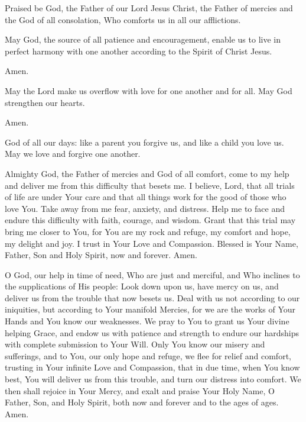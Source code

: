 \label{prayer:times_of_trouble}
Praised be God, the Father of our Lord Jesus Christ, the Father of mercies and the God of all consolation, Who comforts us in all our afflictions.

May God, the source of all patience and encouragement, enable us to live in perfect harmony with one another according to the Spirit of Christ Jesus.

\response Amen.

May the Lord make us overflow with love for one another and for all.
May God strengthen our hearts.

\response Amen.

God of all our days: like a parent you forgive us, and like a child you love us.
May we love and forgive one another.

Almighty God, the Father of mercies and God of all comfort, come to my help and deliver me from this difficulty that besets me.
I believe, Lord, that all trials of life are under Your care and that all things work for the good of those who love You.
Take away from me fear, anxiety, and distress.
Help me to face and endure this difficulty with faith, courage, and wisdom.
Grant that this trial may bring me closer to You, for You are my rock and refuge, my comfort and hope, my delight and joy.
I trust in Your Love and Compassion.
Blessed is Your Name, Father, Son and Holy Spirit, now and forever. Amen.

O God, our help in time of need, Who are just and merciful, and Who inclines to the supplications of His people:
Look down upon us, have mercy on us, and deliver us from the trouble that now besets us.
Deal with us not according to our iniquities, but according to Your manifold Mercies, for we are the works of Your Hands and You know our weaknesses.
We pray to You to grant us Your divine helping Grace, and endow us with patience and strength to endure our hardships with complete submission to Your Will.
Only You know our misery and sufferings, and to You, our only hope and refuge, we flee for relief and comfort, trusting in Your infinite Love and Compassion, that in due time, when You know best, You will deliver us from this trouble, and turn our distress into comfort.
We then shall rejoice in Your Mercy, and exalt and praise Your Holy Name, O Father, Son, and Holy Spirit, both now and forever and to the ages of ages.
Amen.

